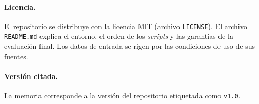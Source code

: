 \paragraph{Licencia.} El repositorio se distribuye con la licencia MIT (archivo
\texttt{LICENSE}). El archivo \texttt{README.md} explica el entorno, el orden de
los \textit{scripts} y las garantías de la evaluación final. Los datos de
entrada se rigen por las condiciones de uso de sus fuentes.

\paragraph{Versión citada.} La memoria corresponde a la versión del repositorio
etiquetada como \texttt{v1.0}.
